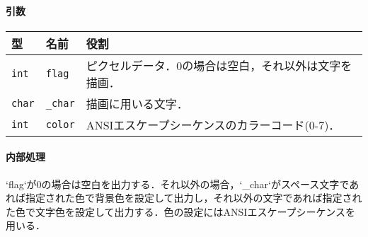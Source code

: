 \documentclass[uplatex]{jsarticle}
\begin{document}
\paragraph{引数}
\begin{center}
    \begin{tabular}{|l|l|p{7cm}|}
        \hline
        \textbf{型} & \textbf{名前} & \textbf{役割} \\ \hline
        \texttt{int} & \texttt{flag} & ピクセルデータ．0の場合は空白，それ以外は文字を描画． \\ \hline
        \texttt{char} & \texttt{\_char} & 描画に用いる文字． \\ \hline
        \texttt{int} & \texttt{color} & ANSIエスケープシーケンスのカラーコード(0-7)． \\ \hline
    \end{tabular}
\end{center}

\paragraph{内部処理}
`flag`が0の場合は空白を出力する．それ以外の場合，`\_char`がスペース文字であれば指定された色で背景色を設定して出力し，それ以外の文字であれば指定された色で文字色を設定して出力する．色の設定にはANSIエスケープシーケンスを用いる．
\end{document}
